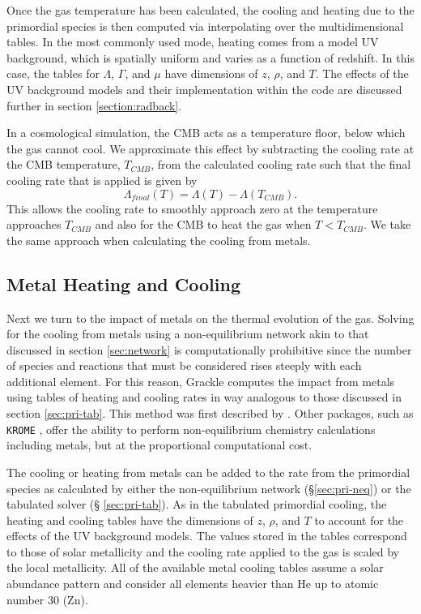 Once the gas temperature has been calculated, the cooling and heating
due to the primordial species is then computed via interpolating over
the multidimensional tables.  In the most commonly used mode, heating
comes from a model UV background, which is spatially uniform and
varies as a function of redshift.  In this case, the tables for
$\Lambda$, $\Gamma$, and $\mu$ have dimensions of $z$, $\rho$, and
$T$.  The effects of the UV background models and their implementation
within the code are discussed further in section
\ref{section:radback}.

In a cosmological simulation, the CMB acts as a temperature floor,
below which the gas cannot cool.  We approximate this effect by
subtracting the cooling rate at the CMB temperature, $T_{CMB}$, from
the calculated cooling rate such that the final cooling rate that is
applied is given by
\begin{equation}
\Lambda_{final}(T) = \Lambda(T) - \Lambda(T_{CMB}).
\end{equation}
This allows the cooling rate to smoothly approach zero at the
temperature approaches $T_{CMB}$ and also for the CMB to heat the gas
when $T < T_{CMB}$.  We take the same approach when calculating the
cooling from metals.


\subsection{Metal Heating and Cooling}

Next we turn to the impact of metals on the thermal evolution of the gas.
Solving for the cooling from metals using a non-equilibrium network
akin to that discussed in section \ref{sec:network} is computationally
prohibitive since the number of species and reactions that must be
considered rises steeply with each additional element.  For this
reason, Grackle computes the impact from metals using tables of
heating and cooling rates in way analogous to those discussed in section
\ref{sec:pri-tab}.  This method was first described by
\citet{2008MNRAS.385.1443S}.  Other packages, such as \texttt{KROME}
\citep{2014MNRAS.439.2386G}, offer the ability to perform
non-equilibrium chemistry calculations including metals, but at the
proportional computational cost.

The cooling or heating from metals can be added to the rate from the
primordial species as calculated by either the non-equilibrium network
(\S \ref{sec:pri-neq}) or the tabulated solver (\S
\ref{sec:pri-tab}).  As in the tabulated primordial cooling, the
heating and cooling tables have the dimensions of $z$, $\rho$, and
$T$ to account for the effects of the UV background models.  The
values stored in the tables correspond to those of solar metallicity
and the cooling rate applied to the gas is scaled by the local
metallicity.  All of the available metal cooling tables assume a solar
abundance pattern and consider all elements heavier than He up to
atomic number 30 (Zn).


